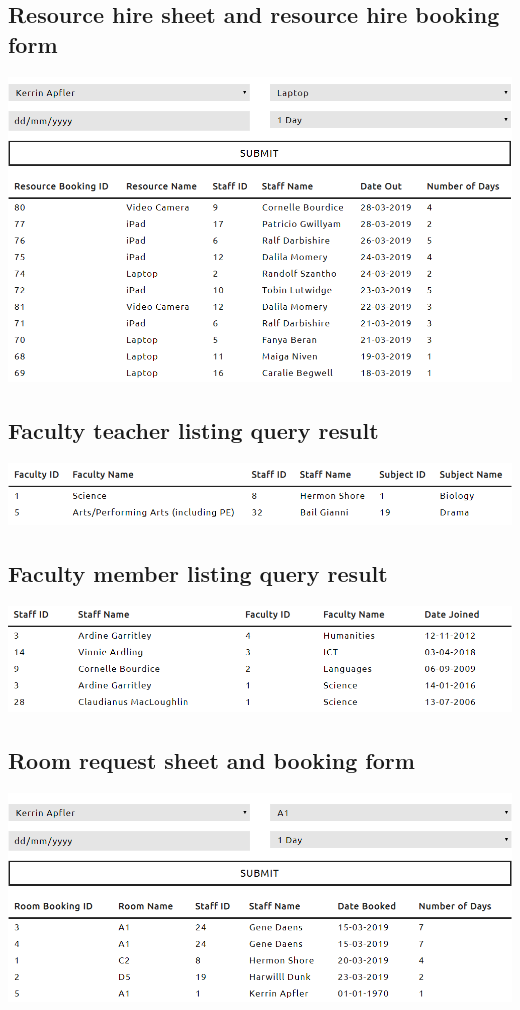 \documentclass{article}
\begin{document}
\subsection{Resource hire sheet and resource hire booking form}
\includegraphics[width=\linewidth]{images/03.png}
\subsection{Faculty teacher listing query result}
\includegraphics[width=\linewidth]{images/04.png}
\subsection{Faculty member listing query result}
\includegraphics[width=\linewidth]{images/05.png}
\subsection{Room request sheet and booking form}
\includegraphics[width=\linewidth]{images/06.png}
\end{document}
